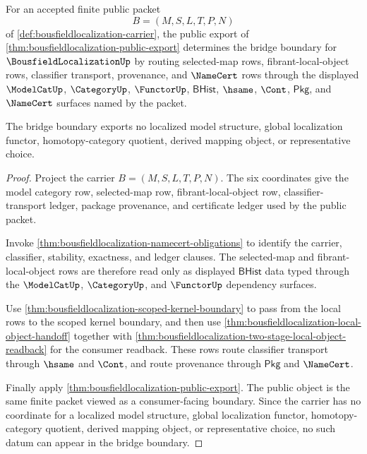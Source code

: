 \begin{theorem}
\label{thm:bousfieldlocalization-bridge-boundary}
For an accepted finite public packet
$$
B=(M,S,L,T,P,N)
$$
of \autoref{def:bousfieldlocalization-carrier}, the public export of
\autoref{thm:bousfieldlocalization-public-export} determines the bridge boundary
for $\BousfieldLocalizationUp$ by routing selected-map rows, fibrant-local-object
rows, classifier transport, provenance, and $\NameCert$ rows through the
displayed $\ModelCatUp$, $\CategoryUp$, $\FunctorUp$, $\mathsf{BHist}$,
$\hsame$, $\Cont$, $\mathsf{Pkg}$, and $\NameCert$ surfaces named by the packet.

The bridge boundary exports no localized model structure, global localization
functor, homotopy-category quotient, derived mapping object, or representative
choice.
\end{theorem}
\begin{proof}
Project the carrier $B=(M,S,L,T,P,N)$. The six coordinates give the model
category row, selected-map row, fibrant-local-object row, classifier-transport
ledger, package provenance, and certificate ledger used by the public packet.

Invoke \autoref{thm:bousfieldlocalization-namecert-obligations} to identify the
carrier, classifier, stability, exactness, and ledger clauses. The selected-map
and fibrant-local-object rows are therefore read only as displayed
$\mathsf{BHist}$ data typed through the $\ModelCatUp$, $\CategoryUp$, and
$\FunctorUp$ dependency surfaces.

Use \autoref{thm:bousfieldlocalization-scoped-kernel-boundary} to pass from the
local rows to the scoped kernel boundary, and then use
\autoref{thm:bousfieldlocalization-local-object-handoff} together with
\autoref{thm:bousfieldlocalization-two-stage-local-object-readback} for the
consumer readback. These rows route classifier transport through $\hsame$ and
$\Cont$, and route provenance through $\mathsf{Pkg}$ and $\NameCert$.

Finally apply \autoref{thm:bousfieldlocalization-public-export}. The public
object is the same finite packet viewed as a consumer-facing boundary. Since the
carrier has no coordinate for a localized model structure, global localization
functor, homotopy-category quotient, derived mapping object, or representative
choice, no such datum can appear in the bridge boundary.
\end{proof}

